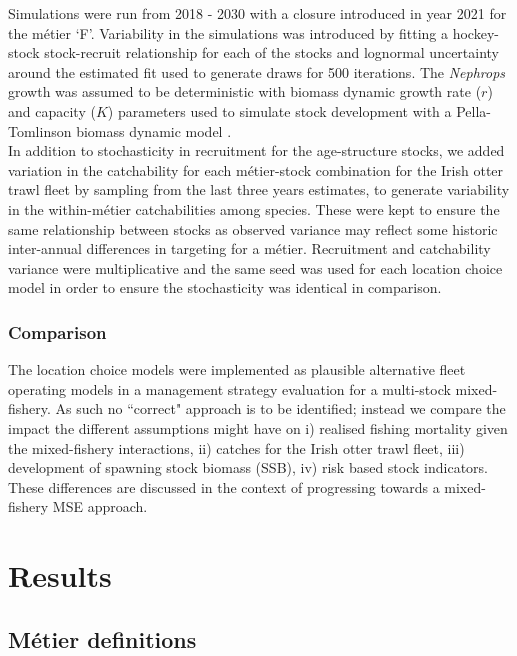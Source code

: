 \documentclass[12pt, halfline, a4paper]{ouparticle}
\begin{document}
Simulations were run from 2018 - 2030 with a closure introduced in year 2021
for the métier `F'. Variability in the simulations was introduced by fitting a
hockey-stock stock-recruit relationship for each of the stocks and lognormal
uncertainty around the estimated fit used to generate draws for 500 iterations.
The \textit{Nephrops} growth was assumed to be deterministic with biomass
dynamic growth rate ($r$) and capacity ($K$) parameters used to simulate stock
development with a Pella-Tomlinson biomass dynamic model \citep{Pella1969}. \\

In addition to stochasticity in recruitment for the age-structure stocks, we
added variation in the catchability for each métier-stock combination for the
Irish otter trawl fleet by sampling from the last three years estimates, to
generate variability in the within-métier catchabilities among species. These
were kept to ensure the same relationship between stocks as observed variance
may reflect some historic inter-annual differences in targeting for a métier.
Recruitment and catchability variance were multiplicative and the same seed was
used for each location choice model in order to ensure the stochasticity was
identical in comparison.

\subsubsection{Comparison}

The location choice models were implemented as plausible alternative fleet
operating models in a management strategy evaluation for a multi-stock
mixed-fishery. As such no ``correct" approach is to be identified; instead we
compare the impact the different assumptions might have on i) realised fishing
mortality given the mixed-fishery interactions, ii) catches for the Irish otter
trawl fleet, iii) development of spawning stock biomass (SSB), iv) risk based
stock indicators. These differences are discussed in the context of progressing
towards a mixed-fishery MSE approach.

\section{Results}
\label{res}

\subsection{Métier definitions}
\end{document}
